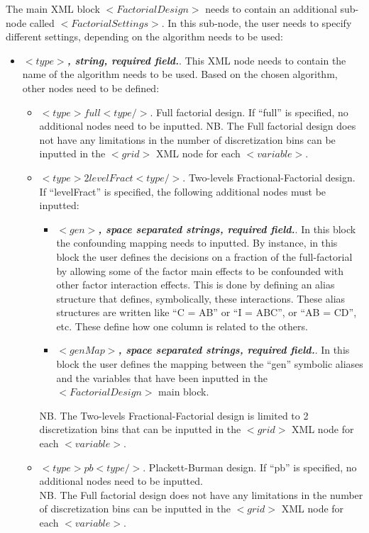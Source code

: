 The main XML block $<FactorialDesign>$ needs to contain an additional sub-node called $<FactorialSettings>$. In this sub-node, the user needs to specify different settings, depending on the algorithm needs to be used:
     \begin{itemize}
      \item $<type>$\textbf{\textit{, string, required field.}}. This XML node needs to contain the name of the algorithm needs to be used. Based on the chosen algorithm, other nodes need to be defined:
      \begin{itemize}
        \item \textit{$<type>full<type/>$}. Full factorial design. If ``full'' is specified, no additional nodes need to be inputted.
         NB. The Full factorial design does not have any limitations in the number of discretization bins can be inputted in the $<grid>$ XML node for each $<variable>$.
         \item \textit{$<type>2levelFract<type/>$}. Two-levels Fractional-Factorial design. If ``levelFract''  is specified, the following additional nodes must be inputted:
         \begin{itemize}
          \item $<gen>$\textbf{\textit{, space separated strings, required field.}}. In this block the confounding mapping needs to inputted.  By instance, in this block the user defines the decisions on a fraction of the full-factorial by allowing some of the factor main effects to be confounded with other factor interaction effects. This is done by defining an alias structure that defines, symbolically, these interactions. These alias structures are written like “C = AB” or “I = ABC”, or “AB = CD”, etc. These define how one column is related to the others.
          \item $<genMap>$\textbf{\textit{, space separated strings, required field.}}. In this block the user defines the mapping between the ``gen'' symbolic aliases and the variables that have been inputted in the $<FactorialDesign>$ main block.
         \end{itemize}
       NB. The Two-levels Fractional-Factorial design is limited to 2 discretization bins that can be inputted in the $<grid>$ XML node for each $<variable>$.
       \item \textit{$<type>pb<type/>$}. Plackett-Burman design. If ``pb'' is specified, no additional nodes need to be inputted.
        \\NB. The Full factorial design does not have any limitations in the number of discretization bins can be inputted in the $<grid>$ XML node for each $<variable>$.
      \end{itemize}
     
    \end{itemize}
